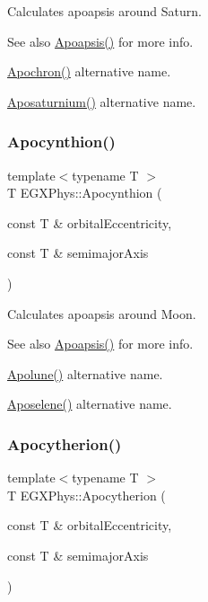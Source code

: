 Calculates apoapsis around Saturn. 

\begin{DoxySeeAlso}{See also}
\mbox{\hyperlink{group___e_g_x_phys-_apoapsis_gaf962e650bf84a568458e8eb39b1c61ba}{Apoapsis()}} for more info. 

\mbox{\hyperlink{group___e_g_x_phys-_apoapsis_gae4ea146039e6f32022321f0998e715e8}{Apochron()}} alternative name. 

\mbox{\hyperlink{group___e_g_x_phys-_apoapsis_gac157adc20a88c8616e4822eb819f9016}{Aposaturnium()}} alternative name. 
\end{DoxySeeAlso}
\mbox{\label{group___e_g_x_phys-_apoapsis_ga557bb4d1a0ce7f17aaa8f8de469d4f52}} 
\subsubsection{\texorpdfstring{Apocynthion()}{Apocynthion()}}
{\footnotesize\ttfamily template$<$typename T $>$ \\
T E\+G\+X\+Phys\+::\+Apocynthion (\begin{DoxyParamCaption}\item[{const T \&}]{orbital\+Eccentricity,  }\item[{const T \&}]{semimajor\+Axis }\end{DoxyParamCaption})}



Calculates apoapsis around Moon. 

\begin{DoxySeeAlso}{See also}
\mbox{\hyperlink{group___e_g_x_phys-_apoapsis_gaf962e650bf84a568458e8eb39b1c61ba}{Apoapsis()}} for more info. 

\mbox{\hyperlink{group___e_g_x_phys-_apoapsis_gacc68b49812c38394611e1ef3a8bf0e3e}{Apolune()}} alternative name. 

\mbox{\hyperlink{group___e_g_x_phys-_apoapsis_gab61f3b2d6a5be3f62f5fb6dfdf802014}{Aposelene()}} alternative name. 
\end{DoxySeeAlso}
\mbox{\label{group___e_g_x_phys-_apoapsis_ga59a284bb0bc11848c5b9ef1283033425}} 
\subsubsection{\texorpdfstring{Apocytherion()}{Apocytherion()}}
{\footnotesize\ttfamily template$<$typename T $>$ \\
T E\+G\+X\+Phys\+::\+Apocytherion (\begin{DoxyParamCaption}\item[{const T \&}]{orbital\+Eccentricity,  }\item[{const T \&}]{semimajor\+Axis }\end{DoxyParamCaption})}




